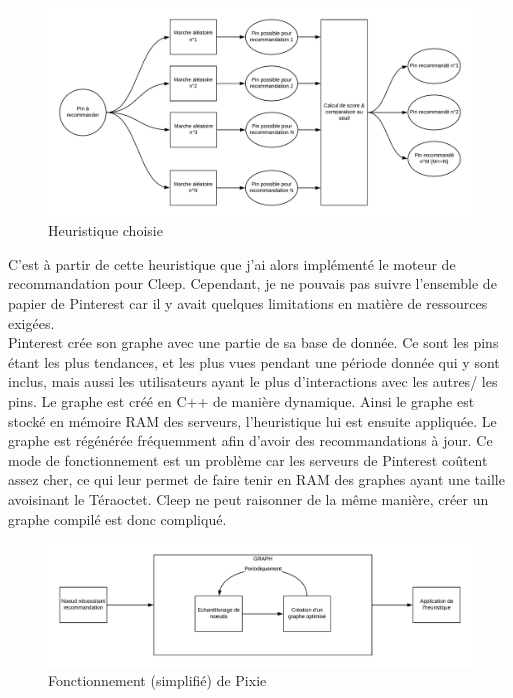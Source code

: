 \documentclass{article} %
\begin{document}
\begin{figure}[!h]
	\centering
	\includegraphics[keepaspectratio = true,scale=0.7]{procpint.png}
	\caption{Heuristique choisie}
	\label{fig:procpint}
\end{figure}

C'est à partir de cette heuristique que j'ai alors implémenté le moteur de recommandation pour Cleep. Cependant, je ne pouvais pas suivre l'ensemble de papier de Pinterest car il y avait quelques limitations en matière de ressources exigées.\\
Pinterest crée son graphe avec une partie de sa base de donnée. Ce sont les pins étant les plus tendances, et les plus vues pendant une période donnée qui y sont inclus, mais aussi les utilisateurs ayant le plus d'interactions avec les autres/ les pins. Le graphe est créé en C++ de manière dynamique. Ainsi le graphe est stocké en mémoire RAM des serveurs, l'heuristique lui est ensuite appliquée. Le graphe est régénérée fréquemment afin d'avoir des recommandations à jour. Ce mode de fonctionnement est un problème car les serveurs de Pinterest coûtent assez cher, ce qui leur permet de faire tenir en RAM des graphes ayant une taille avoisinant le Téraoctet. Cleep ne peut raisonner de la même manière, créer un graphe compilé est donc compliqué. \\

\begin{figure}[!h]
	\centering
	\includegraphics[keepaspectratio = true,scale=0.7]{pintfunc.png}
	\caption{Fonctionnement (simplifié) de Pixie}
	\label{fig:funcpint}
\end{figure}
\end{document}
